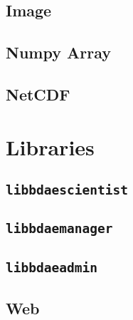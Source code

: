 \subsection{Image}
\subsection{Numpy Array}
\subsection{NetCDF}

\section{Libraries}
\subsection{\texttt{libbdaescientist}}
\subsection{\texttt{libbdaemanager}}
\subsection{\texttt{libbdaeadmin}}
\subsection{Web}
